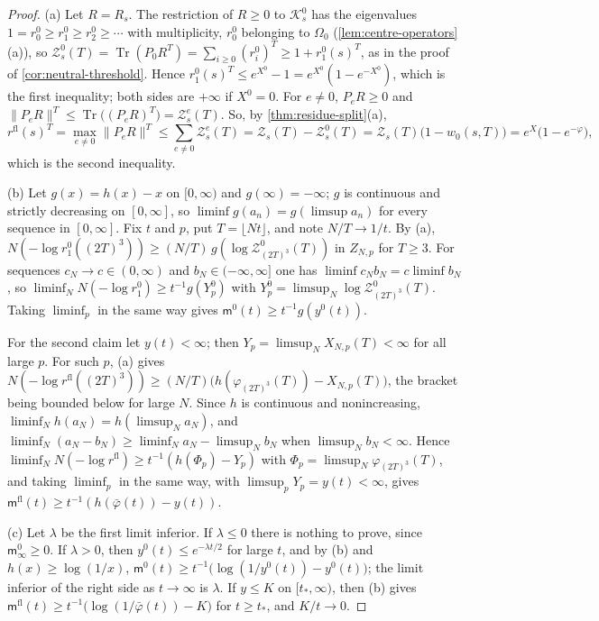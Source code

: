 \documentclass[11pt,a4paper]{amsart}
\theoremstyle{definition}
\theoremstyle{remark}
\numberwithin{equation}{section}
\DeclareMathOperator{\Tr}{Tr}        %
\newcommand{\Kspace}{\mathcal{K}}    %
\newcommand{\norm}[1]{\lVert #1\rVert}     %
\newcommand{\TT}{\mathbb{T}}               %
\newcommand{\Zc}{\mathcal{Z}}              %
\newcommand{\Zs}[2]{\Zc_{#1}(#2)}          %
\newcommand{\cube}[1]{(2#1)^3}             %
\newcommand{\Omegazero}{\Omega_0}          %
\begin{document}
\begin{proof}\enlargethispage{2pt}
(a) Let $R=R_s$. The restriction of $R\ge0$ to $\Kspace^0_s$ has the eigenvalues $1=r^0_0\ge r^0_1\ge r^0_2\ge\cdots$ with multiplicity, $r^0_0$ belonging to $\Omegazero$ (\cref{lem:centre-operators}\textup{(a)}), so $\Zc^0_s(T)=\Tr(P_0R^T)=\sum_{i\ge0}(r^0_i)^T\ge1+r_1^0(s)^T$, as in the proof of \cref{cor:neutral-threshold}. Hence $r_1^0(s)^T\le e^{X^0}-1=e^{X^0}(1-e^{-X^0})$, which is the first inequality; both sides are $+\infty$ if $X^0=0$. For $e\ne0$, $P_eR\ge0$ and $\norm{P_eR}^T\le\Tr\bigl((P_eR)^T\bigr)=\Zc^e_s(T)$. So, by \cref{thm:residue-split}\textup{(a)},
\[
r^{\mathrm{fl}}(s)^T=\max_{e\ne0}\norm{P_eR}^T\le\sum_{e\ne0}\Zc^e_s(T)=\Zs{s}{T}-\Zc^0_s(T)=\Zs{s}{T}\bigl(1-w_0(s,T)\bigr)=e^X\bigl(1-e^{-\varphi}\bigr),
\]
which is the second inequality.

(b) Let $g(x)=h(x)-x$ on $[0,\infty)$ and $g(\infty)=-\infty$; $g$ is continuous and strictly decreasing on $[0,\infty]$, so $\liminf g(a_n)=g(\limsup a_n)$ for every sequence in $[0,\infty]$. Fix $t$ and $p$, put $T=\lfloor Nt\rfloor$, and note $N/T\to1/t$. By (a), $N(-\log r_1^0(\cube T))\ge(N/T)\,g(\log\Zc^0_{\cube T}(T))$ in $Z_{N,p}$ for $T\ge3$. For sequences $c_N\to c\in(0,\infty)$ and $b_N\in(-\infty,\infty]$ one has $\liminf c_Nb_N=c\liminf b_N$, so $\liminf_NN(-\log r^0_1)\ge t^{-1}g(Y^0_p)$ with $Y^0_p=\limsup_N\log\Zc^0_{\cube T}(T)$. Taking $\liminf_p$ in the same way gives $\mathsf m^0(t)\ge t^{-1}g(y^0(t))$.

For the second claim let $y(t)<\infty$; then $Y_p=\limsup_NX_{N,p}(T)<\infty$ for all large $p$. For such $p$, (a) gives $N(-\log r^{\mathrm{fl}}(\cube T))\ge(N/T)\bigl(h(\varphi_{\cube T}(T))-X_{N,p}(T)\bigr)$, the bracket being bounded below for large $N$. Since $h$ is continuous and nonincreasing, $\liminf_Nh(a_N)=h(\limsup_Na_N)$, and $\liminf_N(a_N-b_N)\ge\liminf_Na_N-\limsup_Nb_N$ when $\limsup_Nb_N<\infty$. Hence $\liminf_NN(-\log r^{\mathrm{fl}})\ge t^{-1}(h(\Phi_p)-Y_p)$ with $\Phi_p=\limsup_N\varphi_{\cube T}(T)$, and taking $\liminf_p$ in the same way, with $\limsup_pY_p=y(t)<\infty$, gives $\mathsf m^{\mathrm{fl}}(t)\ge t^{-1}(h(\bar\varphi(t))-y(t))$.

(c) Let $\lambda$ be the first limit inferior. If $\lambda\le0$ there is nothing to prove, since $\mathsf m^0_\infty\ge0$. If $\lambda>0$, then $y^0(t)\le e^{-\lambda t/2}$ for large $t$, and by (b) and $h(x)\ge\log(1/x)$, $\mathsf m^0(t)\ge t^{-1}\bigl(\log(1/y^0(t))-y^0(t)\bigr)$; the limit inferior of the right side as $t\to\infty$ is $\lambda$. If $y\le K$ on $[t_*,\infty)$, then (b) gives $\mathsf m^{\mathrm{fl}}(t)\ge t^{-1}\bigl(\log(1/\bar\varphi(t))-K\bigr)$ for $t\ge t_*$, and $K/t\to0$.


\end{proof}
\end{document}
